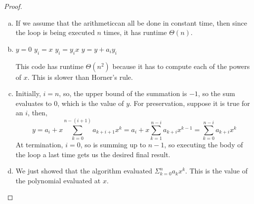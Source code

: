 \documentclass{article}
\begin{document}
\begin{proof}
\begin{enumerate}[a)]
\item

If we assume that the arithmeticcan all  be done in constant time, then since  the loop is being executed $n$ times, it has runtime $\Theta(n)$.

\item
\begin{algorithm}
\begin{algorithmic}[1]
\State $y=0$
\State $y_i = x$
\State $y_i = y_i  x$ 
\EndFor
\State $y = y+ a_i  y_i$
\EndFor
\end{algorithmic}
\end{algorithm}
This code has runtime $\Theta(n^2)$ because it has to compute each of the powers of $x$. This is slower than Horner's rule.

\item
Initially, $i=n$, so, the upper bound of the summation is $-1$, so the sum evaluates to $0$, which is the value of $y$. For preservation, suppose it is true for an $i$, then, 
\[
 y = a_{i} + x \sum_{k=0}^{n-(i+1)} a_{k+i+1} x^k = a_i + x\sum_{k=1}^{n-i} a_{k+i} x^{k-1} = \sum_{k=0}^{n-i} a_{k+i}x^k
 \]
  At termination, $i=0$, so is summing up to $n-1$, so executing the body of the loop a last time gets us  the desired final result.

\item
We just showed that the algorithm evaluated $\Sigma_{k=0}^n a_kx^k$. This is the value of the polynomial evaluated at $x$.


\end{enumerate}
\end{proof}
\end{document}
